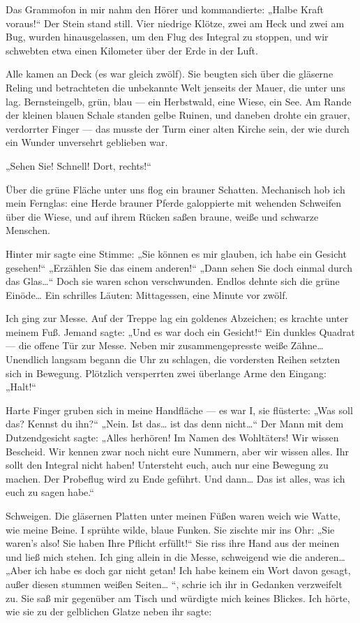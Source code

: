 Das Grammofon in mir nahm den Hörer und kommandierte: „Halbe Kraft
voraus!“ Der Stein stand still. Vier niedrige Klötze, zwei am Heck
und zwei am Bug, wurden hinausgelassen, um den Flug des Integral zu
stoppen, und wir schwebten etwa einen Kilometer über der Erde in
der Luft.

Alle kamen an Deck (es war gleich zwölf). Sie beugten sich über die
gläserne Reling und betrachteten die unbekannte Welt jenseits der
Mauer, die unter uns lag. Bernsteingelb, grün, blau — ein
Herbstwald, eine Wiese, ein See. Am Rande der kleinen blauen Schale
standen gelbe Ruinen, und daneben drohte ein grauer, verdorrter
Finger — das musste der Turm einer alten
Kirche sein, der wie durch ein Wunder unversehrt geblieben war.

„Sehen Sie! Schnell! Dort, rechts!“

Über die grüne Fläche unter uns flog ein brauner Schatten.
Mechanisch hob ich mein Fernglas: eine Herde brauner Pferde
galoppierte mit wehenden Schweifen über die Wiese, und auf ihrem
Rücken saßen braune, weiße und schwarze Menschen.

Hinter mir sagte eine Stimme: „Sie können es mir glauben, ich habe
ein Gesicht gesehen!“ „Erzählen Sie das einem anderen!“ „Dann sehen
Sie doch einmal durch das Glas\ldots{}“ Doch sie waren schon
verschwunden. Endlos dehnte sich die grüne Einöde\ldots{} Ein schrilles
Läuten: Mittagessen, eine Minute vor zwölf.

Ich ging zur Messe. Auf der Treppe lag ein goldenes Abzeichen; es
krachte unter meinem Fuß. Jemand sagte: „Und es war doch ein
Gesicht!“ Ein dunkles Quadrat — die offene Tür zur Messe. Neben mir
zusammengepresste weiße Zähne\ldots{} Unendlich langsam begann die Uhr
zu schlagen, die vordersten Reihen setzten sich in Bewegung.
Plötzlich versperrten zwei überlange Arme den Eingang: „Halt!“

Harte Finger gruben sich in meine Handfläche — es war I, sie
flüsterte: „Was soll das? Kennst du ihn?“ „Nein. Ist das\ldots{} ist das
denn nicht\ldots{}“ Der Mann mit dem Dutzendgesicht sagte: „Alles
herhören! Im Namen des Wohltäters! Wir wissen Bescheid. Wir kennen
zwar noch nicht eure Nummern, aber wir wissen alles. Ihr sollt den
Integral nicht haben! Untersteht euch, auch nur eine Bewegung zu
machen. Der Probeflug wird zu Ende geführt. Und dann\ldots{} Das ist
alles, was ich euch zu sagen habe.“

Schweigen. Die gläsernen Platten unter meinen Füßen waren weich wie
Watte, wie meine Beine. I sprühte wilde, blaue Funken. Sie zischte
mir ins Ohr: „Sie waren's also! Sie haben Ihre
\glq{}Pflicht\grq{} erfüllt!“ Sie riss ihre Hand aus
der meinen und ließ mich stehen. Ich ging allein in die Messe,
schweigend wie die anderen\ldots{} „Aber ich habe es doch gar nicht
getan! Ich habe keinem ein Wort davon gesagt, außer diesen stummen
weißen Seiten\ldots{} “, schrie ich ihr in Gedanken verzweifelt zu. Sie
saß mir gegenüber am Tisch und würdigte mich keines Blickes. Ich
hörte, wie sie zu der gelblichen Glatze neben ihr sagte:


